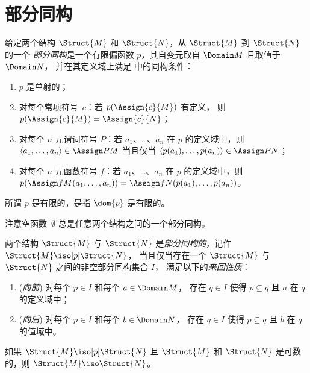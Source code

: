 \documentclass[../../../include/open-logic-section]{subfiles}
\begin{document}
\section{部分同构}

\begin{defn}
  给定两个结构 $\Struct{M}$ 和 $\Struct{N}$，从 $\Struct{M}$ 到 $\Struct{N}$ 的一个
  \emph{部分同构}是一个有限偏函数 $p$，其自变元取自 $\Domain M$ 且取值于 $\Domain N$，
  并在其定义域上满足  中的同构条件：
  \begin{enumerate}
  \item $p$ 是单射的；
  \item 对每个常项符号~$c$：若 $p(\Assign{c}{M})$ 有定义，
    则 $p(\Assign{c}{M}) = \Assign{c}{N}$；
  \item 对每个 $n$ 元谓词符号 $P$：若 $a_1$、\dots、$a_n$
    在 $p$ 的定义域中，则 $\langle a_1, \dots, a_n\rangle \in
    \Assign P M$ 当且仅当 $\langle p(a_1), \dots, p(a_n) \rangle
    \in \Assign P N$；
  \item 对每个 $n$ 元函数符号 $f$：若 $a_1$、\dots、$a_n$
    在 $p$ 的定义域中，则 $p(\Assign f M (a_1, \dots,a_n))
    = \Assign f N (p(a_1), \dots, p(a_n))$。
  \end{enumerate}
  所谓 $p$ 是有限的，是指 $\dom{p}$ 是有限的。
\end{defn}

注意空函数~$\emptyset$ 总是任意两个结构之间的一个部分同构。

\begin{defn}
  两个结构 $\Struct{M}$ 与 $\Struct{N}$ 是\emph{部分同构的}，记作 $\Struct{M} \iso[p]
  \Struct{N}$，
  当且仅当存在一个 $\Struct{M}$ 与 $\Struct{N}$ 之间的非空部分同构集合 $I$，
  满足以下的\emph{来回性质}：
  \begin{enumerate}
  \item (\emph{向前}) 对每个 $p \in I$ 和每个 $a \in \Domain M$，
    存在 $q \in I$ 使得 $p \subseteq q$ 且 $a$ 在 $q$ 的定义域中；
  \item (\emph{向后}) 对每个 $p \in I$ 和每个 $b \in \Domain N$，
    存在 $q \in I$ 使得 $p \subseteq q$ 且 $b$ 在 $q$ 的值域中。
  \end{enumerate}
\end{defn}

\begin{thm}
  如果 $\Struct{M} \iso[p] \Struct{N}$ 且 $\Struct{M}$ 和
  $\Struct{N}$ 是可数的，则 $\Struct{M} \iso
  \Struct{N}$。
\end{thm}
\end{document}
